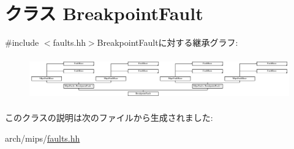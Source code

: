 \hypertarget{classMipsISA_1_1BreakpointFault}{
\section{クラス BreakpointFault}
\label{classMipsISA_1_1BreakpointFault}
}


{\ttfamily \#include $<$faults.hh$>$}BreakpointFaultに対する継承グラフ:\begin{figure}[H]
\begin{center}
\leavevmode
\includegraphics[height=1.87166cm]{classMipsISA_1_1BreakpointFault}
\end{center}
\end{figure}


このクラスの説明は次のファイルから生成されました:\begin{DoxyCompactItemize}
\item 
arch/mips/\hyperlink{arch_2mips_2faults_8hh}{faults.hh}\end{DoxyCompactItemize}
